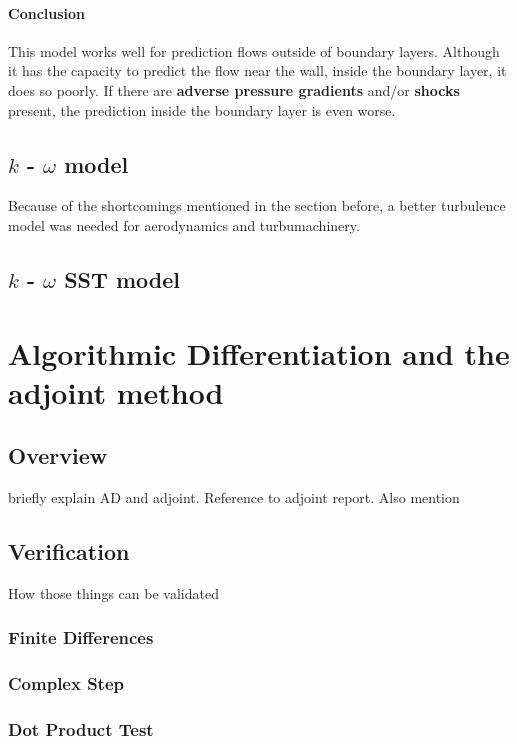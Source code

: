 \paragraph{Conclusion}
This model works well for prediction flows outside of boundary layers. Although
it has the capacity to predict the flow near the wall, inside the boundary
layer, it does so poorly. If there are \textbf{adverse pressure gradients}
and/or \textbf{shocks} present, the prediction inside the boundary layer is
even worse. \cite{cfd101_k-epsilon}



\subsection{$k$ - $\omega$ model}
Because of the shortcomings mentioned in the section before, a better
turbulence model was needed for aerodynamics and turbumachinery.






\subsection{$k$ - $\omega$ SST model}




\section{Algorithmic Differentiation and the adjoint method}
\subsection{Overview}
briefly explain AD and adjoint. Reference to adjoint report. Also mention  


\subsection{Verification}
How those things can be validated 
\subsubsection{Finite Differences}
\subsubsection{Complex Step}
\subsubsection{Dot Product Test}




